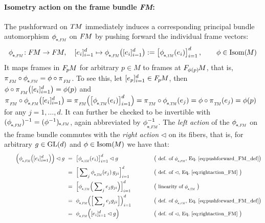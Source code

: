 \paragraph{Isometry action on the frame bundle \textit{FM}:}
The pushforward on $T\mkern-1.5muM$ immediately induces a corresponding principal bundle automorphism $\dphiFM$ on $F\mkern-1.5muM$ by pushing forward the individual frame vectors:
\begin{align}\label{eq:pushforward_FM_def}
    \dphiFM\!: \FM \to \FM,\ \ \ 
    [e_i]_{i=1}^d \mapsto \dphiFM\big([e_i]_{i=1}^d\big) := \big[\dphiTM(e_i)\big]_{i=1}^d \,,
    \qquad \phi\in \IsomM
\end{align}
It maps frames in $F_{\mkern-1.5mu p}\mkern-1.0muM$ for arbitrary $p\in M$ to frames at $F_{\mkern-1mu\phi(p)}\mkern-2mu M$, that is, $\piFM \circ \dphiFM = \phi \circ \piFM$.
To see this, let $[e_p]_{i=1}^d \in F_{\mkern-1.5mu p}\mkern-1.0muM$, then $\phi\circ \piFM\big([e_i]_{i=1}^d\big) = \phi(p)$ and
$ \piFM \circ \dphiFM \big([e_i]_{i=1}^d\big)
= \piFM \pig(\big[ \dphiTM(e_i) \big]_{i=1}^d \pig)
= \piTM \circ \dphiTM (e_j)
= \phi \circ \piTM(e_j)
= \phi(p)$
for any $j=1,\dots,d$.
It can further be checked to be invertible with
$(\dphiFM)^{-1} = (\phi^{-1})_{\mkern-2mu*\mkern-1mu\scalebox{.55}{$,\mkern-2mu F\mkern-3muM$}}$,
again abbreviated by $\dphiFMinv$.
The \emph{left action} of the $\dphiFM$ on the frame bundle commutes with the \emph{right action} $\lhd$ on its fibers, that is, for arbitrary $g\in \operatorname{GL}(d)$ and $\phi \in \operatorname{Isom}(\mkern-1.5mu M \mkern-.5mu)$ we have that:
\begin{alignat}{3}
\label{eq:dpsiFM_right_GL_equiv}
    \qquad
    \Big(\dphiFM \pig( [e_i]_{i=1}^d \pig)\Big) \lhd g
    \ &=\ \big[\dphiTM (e_i)\big]_{i=1}^d \lhd g
        \qquad\quad && \big( \text{\small def. of $\dphiFM$, Eq.~\eqref{eq:pushforward_FM_def}} \big) \notag \\
    \ &=\ \Big[\sum\nolimits_j \dphiTM (e_j)\, g_{ji} \Big]_{i=1}^d
        \qquad\quad && \big( \text{\small def. of $\lhd$, Eq.~\eqref{eq:rightaction_FM} } \big) \notag \\
    \ &=\ \Big[\dphiTM \Big(\sum\nolimits_je_j g_{ji}\Big) \Big]_{i=1}^d
        \qquad\quad && \big( \text{\small linearity of $\dphiTM$ } \big) \notag \\
    \ &=\ \dphiFM \Big(\Big[\sum\nolimits_je_j g_{ji}\Big] \Big)_{i=1}^d
        \qquad\quad && \big( \text{\small def. of $\dphiFM$, Eq.~\eqref{eq:pushforward_FM_def}} \big) \notag \\
    \ &=\ \dphiFM \Big( [e_i]_{i=1}^d \lhd g \Big)
        \qquad\quad && \big( \text{\small def. of $\lhd$, Eq.~\eqref{eq:rightaction_FM} } \big)
\end{alignat}
